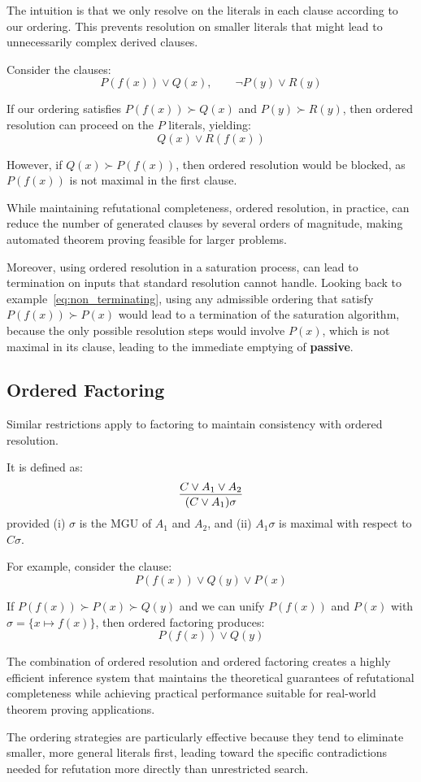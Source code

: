 \noindent The intuition is that we only resolve on the  literals in each clause according to our ordering. This prevents resolution on smaller literals that might lead to unnecessarily complex derived clauses.

Consider the clauses:
\[P(f(x)) \lor Q(x), \qquad \neg P(y) \lor R(y)\]

If our ordering satisfies \(P(f(x)) \succ Q(x)\) and \(P(y) \succ R(y)\), then ordered resolution can proceed on the \(P\) literals, yielding:
\[Q(x) \lor R(f(x))\]

However, if \(Q(x) \succ P(f(x))\), then ordered resolution would be blocked, as \(P(f(x))\) is not maximal in the first clause.

While maintaining refutational completeness, ordered resolution, in practice, can reduce the number of generated clauses by several orders of magnitude, making automated theorem proving feasible for larger problems.

Moreover, using ordered resolution in a saturation process, can lead to termination on inputs that standard resolution cannot handle.
Looking back to example~\ref{eq:non_terminating}, using any admissible ordering that satisfy \(P(f(x)) \succ P(x)\) would lead to a termination of the saturation algorithm, because the only possible resolution steps would involve \(P(x)\), which is not maximal in its clause, leading to the immediate emptying of \textbf{passive}.

\subsection{Ordered Factoring}

Similar restrictions apply to factoring to maintain consistency with ordered resolution.

It is defined as:
\begin{equation}
  \infer{(C \lor A_1)\sigma}{C \lor A_1 \lor A_2}
\end{equation}
\indent provided (i) \(\sigma\) is the MGU of \(A_1\) and \(A_2\), and (ii) \(A_1\sigma\) is maximal with respect to \(C\sigma\).

\noindent For example, consider the clause:
\[P(f(x)) \lor Q(y) \lor P(x)\]

If \(P(f(x)) \succ P(x) \succ Q(y)\) and we can unify \(P(f(x))\) and \(P(x)\) with \(\sigma = \{x \mapsto f(x)\}\), then ordered factoring produces:
\[P(f(x)) \lor Q(y)\]

The combination of ordered resolution and ordered factoring creates a highly efficient inference system that maintains the theoretical guarantees of refutational completeness while achieving practical performance suitable for real-world theorem proving applications.

The ordering strategies are particularly effective because they tend to eliminate smaller, more general literals first, leading toward the specific contradictions needed for refutation more directly than unrestricted search.


